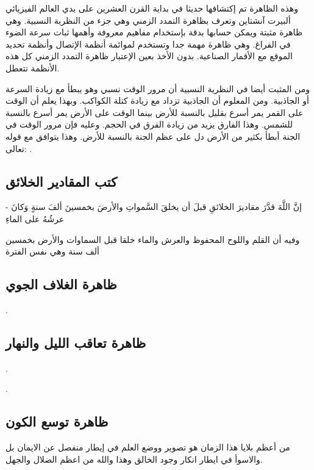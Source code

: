 وهذه الظاهرة تم إكتشافها حديثا في بداية القرن العشرين على يدي العالم الفيزيائي ألبيرت آنشتاين وتعرف بظاهرة التمدد الزمني وهي جزء من النظرية النسبية. وهي ظاهرة مثبتة ويمكن حسابها بدقة بإستخدام مفاهيم معروفة وأهمها ثبات سرعة الضوء في الفراغ. وهي ظاهرة مهمة جدا وتستخدم لموائمة أنظمة الإتصال وأنظمة تحديد الموقع مع الأقمار الصناعية. بدون الأخذ بعين الإعتبار ظاهرة التمدد الزمني كل هذه الأنظمة تتعطل.

ومن المثبت أيضا في النظرية النسبية أن مرور الوقت نسبي وهو يبطأ مع زيادة السرعة أو الجاذبية. ومن المعلوم أن الجاذبية تزداد مع زيادة كتلة الكواكب. وبهذا يعلم أن الوقت على القمر يمر أسرع بقليل بالنسبة للأرض بينما الوقت على الأرض يمر أسرع بالنسبة للشمس. وهذا الفارق يزيد من زيادة الفرق في الحجم. وعليه فإن مرور الوقت في الجنة أبطأ بكثير من الأرض دل على عظم الجنة بالنسبة للأرض. وهذا يتوافق مع قوله تعالى:
\quranayah*[3][133]{\footnotesize \surahname*[3]}.

\subsection{كتب المقادير الخلائق}

- إنَّ اللَّهَ قدَّرَ مقاديرَ الخلائقِ قبلَ أن يخلقَ السَّمواتِ والأرضَ بخمسينَ ألفَ سنةٍ وَكانَ عرشُهُ على الماءِ

وفيه أن القلم واللوح المحفوظ والعرش والماء خلقا قبل السماوات والأرض بخمسين ألف سنة وهي نفس الفترة


\subsection{ظاهرة الغلاف الجوي}

\quranayah*[36][36-40]{\footnotesize \surahname*[36]}.


\subsection{ظاهرة تعاقب الليل والنهار}

\quranayah*[3][27]{\footnotesize \surahname*[3]}.

\quranayah*[24][44]{\footnotesize \surahname*[24]}.


\subsection{ظاهرة توسع الكون}

من أعظم بلايا هذا الزمان هو تصوير ووضع العلم في إيطار منفصل عن الايمان بل والاسوأ في ايطار انكار وجود الخالق وهذا والله من اعظم الضلال والجهل.

